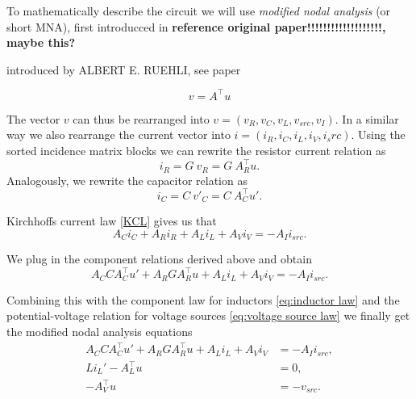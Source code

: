 To mathematically describe the circuit we will use \emph{modified nodal analysis} (or short MNA), first introducced in \textbf{reference original paper!!!!!!!!!!!!!!!!!!!, maybe this?}
	
	introduced by ALBERT E. RUEHLI, see paper	
	
	
\begin{displaymath}
	v = A^\top u
\end{displaymath}

The vector $v$ can thus be rearranged into $v = (v_R, v_C, v_L, v_{src}, v_I)$. In a similar way we also rearrange the current vector into $i = (i_R, i_C, i_L, i_V, i_src)$. Using the sorted incidence matrix blocks we can rewrite the resistor current relation as
	\begin{displaymath}
		i_R = G \ v_R = G \ A_R^\top u.
	\end{displaymath}
Analogously, we rewrite the capacitor relation as
	\begin{displaymath}
		i_C = C \ v'_C = C \ A_C^\top u'.
	\end{displaymath}

Kirchhoffs current law \eqref{KCL} gives us that
\begin{displaymath}
	A_C i_C + A_R i_R + A_L i_L + A_V i_V = -A_I i_{src}.
\end{displaymath}

We plug in the component relations derived above and obtain
\begin{displaymath}
	A_C C A_C^\top u' + A_R G A_R^\top u + A_L i_L + A_V i_V = -A_I i_{src}.
 \end{displaymath}

Combining this with the component law for inductors \eqref{eq:inductor law} and the potential-voltage relation for voltage sources \eqref{eq:voltage source law} we finally get the modified nodal analysis equations
\begin{displaymath}
	\begin{aligned}
		A_C C A_C^\top u' + A_R G A_R^\top u + A_L i_L + A_V i_V &= - A_I i_{src} , \\
		L i_L'	- A_L^\top u &= 0 , \\
		-A_V^\top u &=  -v_{src}.
	\end{aligned}	
\end{displaymath}

